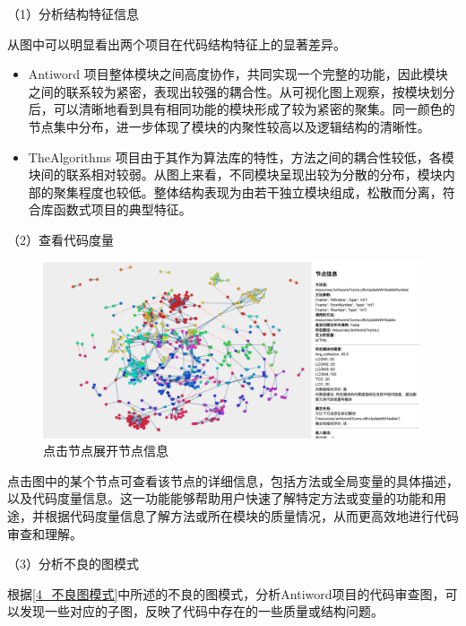 \noindent（1）分析结构特征信息

从图中可以明显看出两个项目在代码结构特征上的显著差异。
\begin{itemize}
    \item Antiword 项目整体模块之间高度协作，共同实现一个完整的功能，因此模块之间的联系较为紧密，表现出较强的耦合性。从可视化图上观察，按模块划分后，可以清晰地看到具有相同功能的模块形成了较为紧密的聚集。同一颜色的节点集中分布，进一步体现了模块的内聚性较高以及逻辑结构的清晰性。
    
    \item TheAlgorithms 项目由于其作为算法库的特性，方法之间的耦合性较低，各模块间的联系相对较弱。从图上来看，不同模块呈现出较为分散的分布，模块内部的聚集程度也较低。整体结构表现为由若干独立模块组成，松散而分离，符合库函数式项目的典型特征。
\end{itemize}

\noindent（2）查看代码度量

\begin{figure}[h]
\centering
\includegraphics[width = 1\textwidth]{figures/点击节点查看.png}
\caption{点击节点展开节点信息}
\end{figure}

 点击图中的某个节点可查看该节点的详细信息，包括方法或全局变量的具体描述，以及代码度量信息。这一功能能够帮助用户快速了解特定方法或变量的功能和用途，并根据代码度量信息了解方法或所在模块的质量情况，从而更高效地进行代码审查和理解。

\noindent（3）分析不良的图模式

根据\ref{4_不良图模式}中所述的不良的图模式，分析Antiword项目的代码审查图，可以发现一些对应的子图，反映了代码中存在的一些质量或结构问题。


